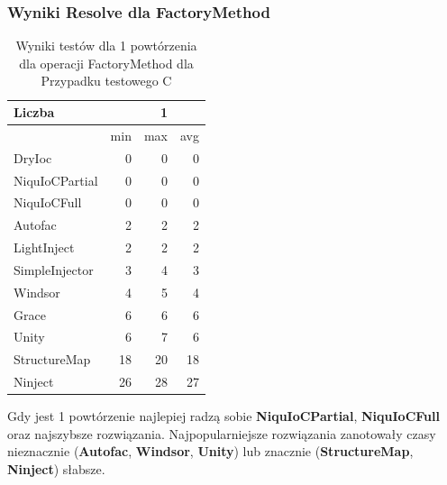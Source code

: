 \documentclass[12pt]{article}
\begin{document}
\subsubsection{Wyniki Resolve dla FactoryMethod}
\begin{table}[H]
\captionsetup{belowskip=0pt,aboveskip=0pt}
\begin{center}
\begin{small}
	\begin{tabular}{ | l | r r r | }
    		\hline
Liczba & & 1 & \\ \hline
 & min & max & avg \\ \hline
DryIoc & 0 & 0 & 0 \\ \hline
NiquIoCPartial & 0 & 0 & 0 \\ \hline
NiquIoCFull & 0 & 0 & 0 \\ \hline
Autofac & 2 & 2 & 2 \\ \hline
LightInject & 2 & 2 & 2 \\ \hline
SimpleInjector & 3 & 4 & 3 \\ \hline
Windsor & 4 & 5 & 4 \\ \hline
Grace & 6 & 6 & 6 \\ \hline
Unity & 6 & 7 & 6 \\ \hline
StructureMap & 18 & 20 & 18 \\ \hline
Ninject & 26 & 28 & 27 \\ \hline
  	\end{tabular}
\end{small}
\end{center}
\caption{Wyniki testów dla 1 powtórzenia dla operacji FactoryMethod dla Przypadku testowego C}
\label{TestCaseC_FactoryMethod1}
\end{table}
Gdy jest 1 powtórzenie najlepiej radzą sobie \textbf{NiquIoCPartial}, \textbf{NiquIoCFull} oraz najszybsze rozwiązania. Najpopularniejsze rozwiązania zanotowały czasy nieznacznie (\textbf{Autofac}, \textbf{Windsor}, \textbf{Unity}) lub znacznie (\textbf{StructureMap}, \textbf{Ninject}) słabsze.
\\ \\
\end{document}
